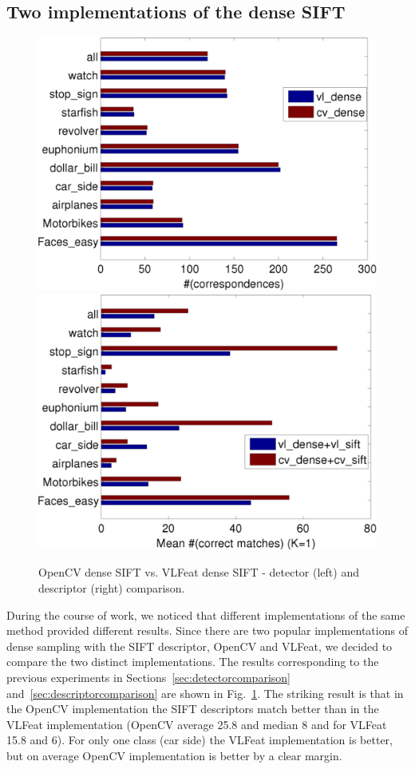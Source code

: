 \documentclass[journal]{IEEEtran}
\begin{document}
%
\subsection{Two implementations of the dense {SIFT}}
%
%
\begin{figure}[h]
  \begin{center}
    \includegraphics[width=0.48\linewidth]{resources/joni_results/PLOT_detectors_benchmark1report1-detcor-avg_denseonly.png}
    \includegraphics[width=0.48\linewidth]{resources/joni_results/result-figure-report2-mean-all-besmatches-1_denseonly.png}
\caption{OpenCV dense SIFT vs. VLFeat dense SIFT - detector (left) and descriptor (right)
comparison.}
\label{fig:densecomparison}
\end{center}
\end{figure}
%
During the course of work, we noticed that different implementations
of the same method provided different results. Since there are two
popular implementations of dense sampling with the SIFT descriptor,
OpenCV and VLFeat,
we decided to compare the two distinct implementations. The
results corresponding to the previous experiments in 
Sections~\ref{sec:detectorcomparison} and~\ref{sec:descriptorcomparison}
are shown in Fig.~\ref{fig:densecomparison}. %
The striking result is
that in the OpenCV implementation the SIFT descriptors match better
than in the VLFeat implementation (OpenCV average 25.8 and median 8 and
for VLFeat 15.8 and 6). For only one class (car side) the VLFeat implementation
is better, but on average OpenCV implementation is better by a clear margin.
\end{document}
